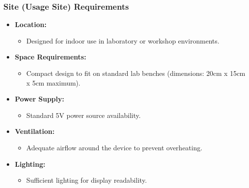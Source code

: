 \documentclass[a4paper,12pt]{article}
\begin{document}
\subsubsection{Site (Usage Site) Requirements}
\begin{itemize}
    \item \textbf{Location:}
    \begin{itemize}
        \item Designed for indoor use in laboratory or workshop environments.
    \end{itemize}
    \item \textbf{Space Requirements:}
    \begin{itemize}
        \item Compact design to fit on standard lab benches (dimensions: 20cm x 15cm x 5cm maximum).
    \end{itemize}
    \item \textbf{Power Supply:}
    \begin{itemize}
        \item Standard 5V power source availability.
    \end{itemize}
    \item \textbf{Ventilation:}
    \begin{itemize}
        \item Adequate airflow around the device to prevent overheating.
    \end{itemize}
    \item \textbf{Lighting:}
    \begin{itemize}
        \item Sufficient lighting for display readability.
    \end{itemize}
\end{itemize}
\end{document}

